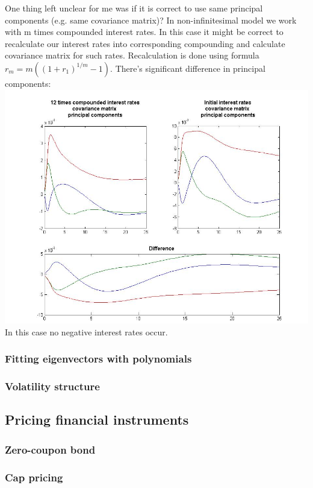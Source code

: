 \documentclass[11pt]{article} %
\begin{document}
One thing left unclear for me was if it is correct to use same principal components (e.g. same covariance matrix)? In non-infinitesimal model we work with m times compounded interest rates. In this case it might be correct to recalculate our interest rates into corresponding compounding and calculate covariance matrix for such rates. Recalculation is done using formula $r_m = m\left((1+r_1)^{1/m}-1\right)$. There's significant difference in principal components:\\
 \includegraphics[scale=0.4]{compounding_PCA.jpg}\\
In this case no negative interest rates occur.

\subsubsection{Fitting eigenvectors with polynomials}


\subsubsection{Volatility structure}
\subsection{Pricing financial instruments}
\subsubsection{Zero-coupon bond}
\subsubsection{Cap pricing}
\end{document}
